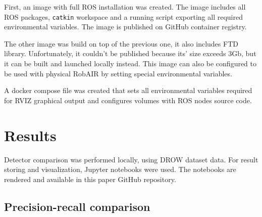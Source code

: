 \documentclass{article}
\begin{document}
First, an image with full ROS installation was created.
The image includes all ROS packages, \texttt{catkin}\cite{catkin_wiki} workspace and a running script exporting all required environmental variables.
The image is published on GitHub container registry\cite{FTD_docker_image}.

The other image was build on top of the previous one, it also includes FTD library.
Unfortunately, it couldn't be published because its' size exceeds 3Gb, but it can be built and launched locally instead.
This image can also be configured to be used with physical RobAIR by setting special environmental variables.

A docker compose file was created that sets all environmental variables required for RVIZ graphical output and configures volumes with ROS nodes source code.

\section{Results}

Detector comparison was performed locally, using DROW dataset data.
For result storing and visualization, Jupyter notebooks were used.
The notebooks are rendered and available in this paper GitHub repository\cite{FTD_comparison}.

\subsection{Precision-recall comparison}
\end{document}
